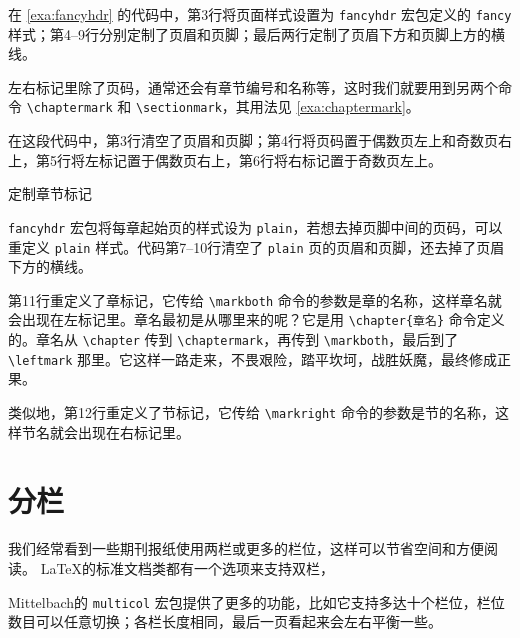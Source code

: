 在 \autoref{exa:fancyhdr} 的代码中，第3行将页面样式设置为 \texttt{fancyhdr} 宏包定义的 \texttt{fancy} 样式；第4--9行分别定制了页眉和页脚；最后两行定制了页眉下方和页脚上方的横线。

左右标记里除了页码，通常还会有章节编号和名称等，这时我们就要用到另两个命令 \verb|\chaptermark| 和 \verb|\sectionmark|，其用法见 \autoref{exa:chaptermark}。

在这段代码中，第3行清空了页眉和页脚；第4行将页码置于偶数页左上和奇数页右上，第5行将左标记置于偶数页右上，第6行将右标记置于奇数页左上。

\begin{example}[htbp]
\caption{定制章节标记}
\label{exa:chaptermark}
\end{example}

\texttt{fancyhdr} 宏包将每章起始页的样式设为 \texttt{plain}，若想去掉页脚中间的页码，可以重定义 \texttt{plain} 样式。代码第7--10行清空了 \texttt{plain} 页的页眉和页脚，还去掉了页眉下方的横线。

第11行重定义了章标记，它传给 \verb|\markboth| 命令的参数是章的名称，这样章名就会出现在左标记里。章名最初是从哪里来的呢？它是用 \verb|\chapter{章名}| 命令定义的。章名从 \verb|\chapter| 传到 \verb|\chaptermark|，再传到 \verb|\markboth|，最后到了 \verb|\leftmark| 那里。它这样一路走来，不畏艰险，踏平坎坷，战胜妖魔，最终修成正果。

类似地，第12行重定义了节标记，它传给 \verb|\markright| 命令的参数是节的名称，这样节名就会出现在右标记里。

\section{分栏}

我们经常看到一些期刊报纸使用两栏或更多的栏位，这样可以节省空间和方便阅读。 \LaTeX 的标准文档类都有一个选项来支持双栏，


Mittelbach\indexMittelbach 的 \texttt{multicol} 宏包提供了更多的功能，比如它支持多达十个栏位，栏位数目可以任意切换；各栏长度相同，最后一页看起来会左右平衡一些。

